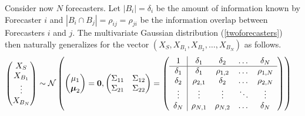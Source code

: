 \documentclass[11pt]{article}
\theoremstyle{definition}
\theoremstyle{definition}
\begin{document}
Consider now $N$ forecasters. Let $|B_i| = \delta_i$ be the amount of
information known by Forecaster $i$ and $|B_i
\cap B_j| = \rho_{ij} = \rho_{ji}$ be the information overlap between
Forecasters $i$ and $j$. The multivariate Gaussian distribution (\ref{twoforecasters}) then naturally generalizes for the vector
$\left(X_{S}, X_{B_1}, X_{B_2}, \dots, X_{B_N}\right)$ as follows.
\begin{align}
\left(\begin{matrix} X_S \\ X_{B_1}\\ \vdots \\ X_{B_N} \end{matrix}\right) &\sim \mathcal{N}\left( \left(\begin{matrix} 
\mu_1 \\ \boldsymbol{\mu}_2
 \end{matrix}\right) =
 \boldsymbol{0}, \left(\begin{matrix} 
\Sigma_{11} & \Sigma_{12}\\
\Sigma_{21} & \Sigma_{22}\\
 \end{matrix}\right) 
 =
 \left(\begin{array}{c | c c cc }
1 & \delta_1 & \delta_2 & \dots & \delta_N  \\ \hline
\delta_1 & \delta_1 &\rho_{1,2} & \dots & \rho_{1,N}   \\ 
\delta_2 & \rho_{2,1} & \delta_2 & \dots & \rho_{2,N}  \\ 
\vdots & \vdots & \vdots & \ddots & \vdots  \\ 
\delta_N & \rho_{N,1} & \rho_{N,2} & \dots & \delta_N\\ 
 \end{array}\right)\right)  \label{Nforecasters}
\end{align}
\end{document}
